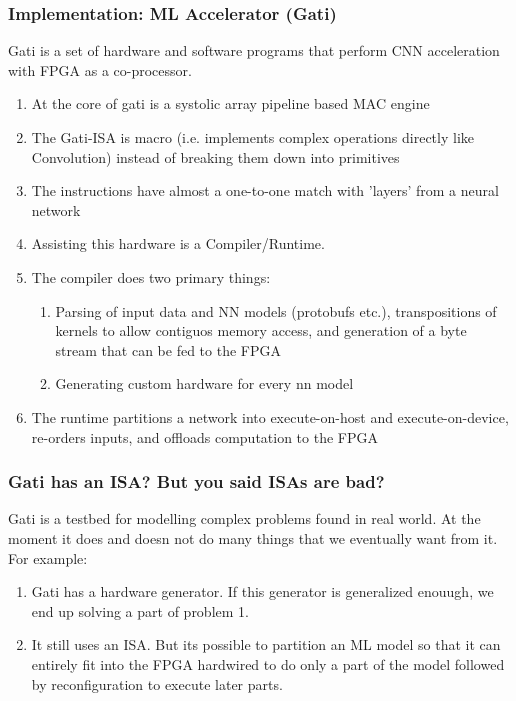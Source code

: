 \documentclass{beamer}
\begin{document}
\begin{frame}[fragile]
  \frametitle{Implementation: ML Accelerator (Gati)}
  Gati is a set of hardware and software programs that perform CNN
  acceleration with FPGA as a co-processor.
  \begin{enumerate}
    \item At the core of gati is a systolic array pipeline based MAC engine
    \item The Gati-ISA is macro (i.e. implements complex operations directly
      like Convolution) instead of breaking them down into primitives
    \item The instructions have almost a one-to-one match with 'layers'
      from a neural network
    \item Assisting this hardware is a Compiler/Runtime.
    \item The compiler does two primary things:
      \begin{enumerate}
        \item Parsing of input data and NN models (protobufs etc.),
          transpositions of kernels to allow contiguos memory access, and generation
          of a byte stream that can be fed to the FPGA
        \item Generating custom hardware for every nn model
      \end{enumerate}
    \item The runtime partitions a network into execute-on-host and
      execute-on-device, re-orders inputs, and offloads computation
      to the FPGA
  \end{enumerate}
\end{frame}

\begin{frame}[fragile]
  \frametitle{Gati has an ISA? But you said ISAs are bad?}
  Gati is a testbed for modelling complex problems found in real world.
  At the moment it does and doesn not do many things that we eventually want
  from it.
  For example:
  \begin{enumerate}
    \item Gati has a hardware generator. If this generator is generalized
      enouugh, we end up solving a part of problem 1.
    \item It still uses an ISA. But its possible to partition an ML
      model so that it can entirely fit into 
      the FPGA hardwired to do only a part of the model followed by
      reconfiguration to execute later parts.
  \end{enumerate}
\end{frame}
\end{document}
